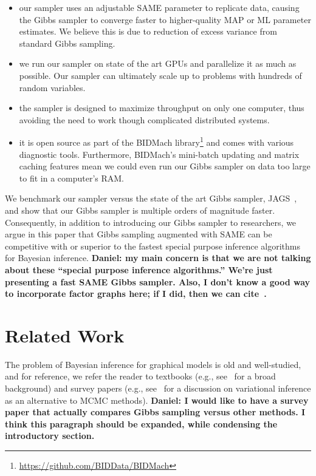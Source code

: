 \documentclass{article} %
\begin{document}
\begin{itemize}[noitemsep]
    \item our sampler uses an adjustable SAME parameter to replicate data, causing the Gibbs sampler
    to converge faster to higher-quality MAP or ML parameter estimates. We believe this is due to
    reduction of excess variance from standard Gibbs sampling.
    \item we run our sampler on state of the art GPUs and parallelize it as much as possible. Our
    sampler can ultimately scale up to problems with hundreds of random variables.
    \item the sampler is designed to maximize throughput on only one computer, thus avoiding the
    need to work though complicated distributed systems.
    \item it is open source as part of the BIDMach
    library\footnote{\url{https://github.com/BIDData/BIDMach}} and comes with various diagnostic
    tools. Furthermore, BIDMach's mini-batch updating and matrix caching features mean we could even
    run our Gibbs sampler on data too large to fit in a computer's RAM.
\end{itemize}

We benchmark our sampler versus the state of the art Gibbs sampler, JAGS~\citep{JAGS2003}, and show
that our Gibbs sampler is multiple orders of magnitude faster. Consequently, in addition to
introducing our Gibbs sampler to researchers, we argue in this paper that Gibbs sampling augmented
with SAME can be competitive with or superior to the fastest special purpose inference algorithms
for Bayesian inference. \textbf{Daniel: my main concern is that we are not talking about these
``special purpose inference algorithms.'' We're just presenting a fast SAME Gibbs sampler.  Also, I
don't know a good way to incorporate factor graphs here; if I did, then we can
cite~\citep{Factorie2009}.}





\section{Related Work}\label{sec:related_work}

The problem of Bayesian inference for graphical models is old and well-studied, and for reference,
we refer the reader to textbooks (e.g., see~\citet{Koller2009} for a broad background) and survey
papers (e.g., see~\citet{Wainwright2008} for a discussion on variational inference as an alternative
to MCMC methods). \textbf{Daniel: I would like to have a survey paper that actually compares Gibbs
sampling versus other methods. I think this paragraph should be expanded, while condensing the
introductory section.}
\end{document}
